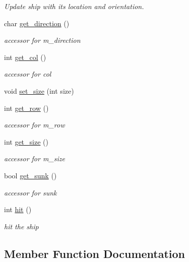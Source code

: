 \begin{DoxyCompactItemize}
\begin{DoxyCompactList}\small\item\em Update ship with its location and orientation. \end{DoxyCompactList}\item 
char \mbox{\hyperlink{classShip_af065dcecca900497523b90776d0b0a0b}{get\+\_\+direction}} ()
\begin{DoxyCompactList}\small\item\em accessor for m\+\_\+direction \end{DoxyCompactList}\item 
int \mbox{\hyperlink{classShip_a3cf96281f9fb1c6e9396788adff1043d}{get\+\_\+col}} ()
\begin{DoxyCompactList}\small\item\em accessor for col \end{DoxyCompactList}\item 
void \mbox{\hyperlink{classShip_a8da09394c4589df4e95e023c4ae43139}{set\+\_\+size}} (int size)
\item 
int \mbox{\hyperlink{classShip_a36013095f752db7f97c0ab56ae2d036f}{get\+\_\+row}} ()
\begin{DoxyCompactList}\small\item\em accessor for m\+\_\+row \end{DoxyCompactList}\item 
int \mbox{\hyperlink{classShip_afe7fd5445de926a8dc0c2915422fc7ae}{get\+\_\+size}} ()
\begin{DoxyCompactList}\small\item\em accessor for m\+\_\+size \end{DoxyCompactList}\item 
bool \mbox{\hyperlink{classShip_a4fc2f7b7c31b58ab2ce82ffaef193d17}{get\+\_\+sunk}} ()
\begin{DoxyCompactList}\small\item\em accessor for sunk \end{DoxyCompactList}\item 
int \mbox{\hyperlink{classShip_ad9e415b084ced1a4380f3dbae0765866}{hit}} ()
\begin{DoxyCompactList}\small\item\em hit the ship \end{DoxyCompactList}\end{DoxyCompactItemize}


\subsection{Member Function Documentation}
\mbox{\label{classShip_a3cf96281f9fb1c6e9396788adff1043d}} 
